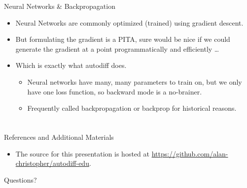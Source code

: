 \documentclass[pdf]{beamer}
\makeatletter
\def\beamer@writeslidentry@miniframesoff{%
  \expandafter\beamer@ifempty\expandafter{\beamer@framestartpage}{}%
  {%
    \clearpage\beamer@notesactions%
  }
}
\newcommand*{\miniframesoff}{\let\beamer@writeslidentry=\beamer@writeslidentry@miniframesoff}
\makeatother
\begin{document}
\begin{frame}{Neural Networks \& Backpropagation}
  \begin{itemize}
  \item Neural Networks are commonly optimized (trained) using gradient descent.
    \pause
  \item But formulating the gradient is a PITA, sure would be nice if we could
    generate the gradient at a point programmatically and efficiently \ldots
    \pause
  \item Which is exactly what autodiff does.
    \begin{itemize}
    \item Neural networks have many, many parameters to train on, but we only
      have one loss function, so backward mode is a no-brainer.
    \item Frequently called backpropagation or backprop for historical reasons.
    \end{itemize}
  \end{itemize}
\end{frame}

\miniframesoff
\section*{}
\begin{frame}{References and Additional Materials}
  \begin{itemize}
  \item The source for this presentation is hosted at
    \url{https://github.com/alan-christopher/autodiff-edu}.
  \end{itemize}
\end{frame}

\begin{frame}{Questions?}
\end{frame}
\end{document}
